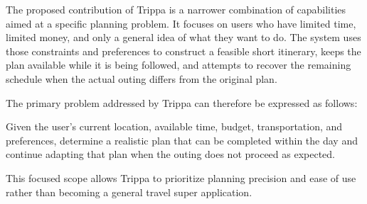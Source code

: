 The proposed contribution of Trippa is a narrower combination of capabilities aimed at a specific planning problem. It focuses on users who have limited time, limited money, and only a general idea of what they want to do. The system uses those constraints and preferences to construct a feasible short itinerary, keeps the plan available while it is being followed, and attempts to recover the remaining schedule when the actual outing differs from the original plan.


The primary problem addressed by Trippa can therefore be expressed as follows:


Given the user's current location, available time, budget, transportation, and preferences, determine a realistic plan that can be completed within the day and continue adapting that plan when the outing does not proceed as expected.


This focused scope allows Trippa to prioritize planning precision and ease of use rather than becoming a general travel super application.

